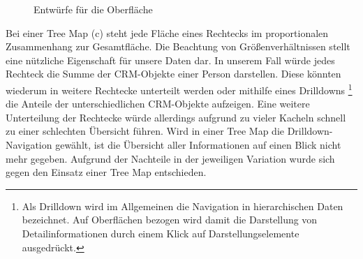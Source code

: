 \begin{figure}[htbp]
\hfill
{}\hfill
{}\hfill
{}
\caption{Entwürfe für die Oberfläche}
\label{konzept_darstellung2}
\end{figure}

Bei einer Tree Map (c) steht jede Fläche eines Rechtecks im proportionalen Zusammenhang zur Gesamtfläche. Die Beachtung von Größenverhältnissen stellt eine nützliche Eigenschaft für unsere Daten dar. In unserem Fall würde jedes Rechteck die Summe der CRM-Objekte einer Person darstellen. Diese könnten wiederum in weitere Rechtecke unterteilt werden oder mithilfe eines Drilldowns
\footnote{Als Drilldown wird im Allgemeinen die Navigation in hierarchischen Daten bezeichnet. Auf Oberflächen bezogen wird damit die Darstellung von Detailinformationen durch einem Klick auf Darstellungselemente ausgedrückt.}
 die Anteile der unterschiedlichen CRM-Objekte aufzeigen. Eine weitere Unterteilung der Rechtecke würde allerdings aufgrund zu vieler Kacheln schnell zu einer schlechten Übersicht führen. Wird in einer Tree Map die Drilldown-Navigation gewählt, ist die Übersicht aller Informationen auf einen Blick nicht mehr gegeben. Aufgrund der Nachteile in der jeweiligen Variation wurde sich gegen den Einsatz einer Tree Map entschieden.

